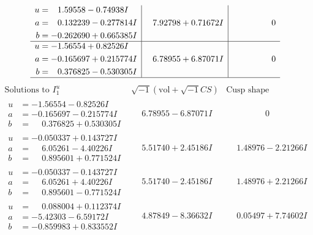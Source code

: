 \documentclass[1p]{elsarticle_modified}
\theoremstyle{definition}
\newcommand{\I}{\sqrt{-1}}
\begin{document}
$$\begin{array}{c|c|c}
\begin{aligned}
u &= \phantom{-}1.59558 - 0.74938 I \\
a &= \phantom{-}0.132239 - 0.277814 I \\
b &= -0.262690 + 0.665385 I\end{aligned}
 & \phantom{-}7.92798 + 0.71672 I & \phantom{-0.000000 } 0 \\ \hline\begin{aligned}
u &= -1.56554 + 0.82526 I \\
a &= -0.165697 + 0.215774 I \\
b &= \phantom{-}0.376825 - 0.530305 I\end{aligned}
 & \phantom{-}6.78955 + 6.87071 I & \phantom{-0.000000 } 0\\
 \hline 
 \end{array}$$\newpage$$\begin{array}{c|c|c}  
\text{Solutions to }I^u_{1}& \I (\text{vol} + \sqrt{-1}CS) & \text{Cusp shape}\\
 \hline 
\begin{aligned}
u &= -1.56554 - 0.82526 I \\
a &= -0.165697 - 0.215774 I \\
b &= \phantom{-}0.376825 + 0.530305 I\end{aligned}
 & \phantom{-}6.78955 - 6.87071 I & \phantom{-0.000000 } 0 \\ \hline\begin{aligned}
u &= -0.050337 + 0.143727 I \\
a &= \phantom{-}6.05261 - 4.40226 I \\
b &= \phantom{-}0.895601 + 0.771524 I\end{aligned}
 & \phantom{-}5.51740 + 2.45186 I & \phantom{-}1.48976 - 2.21266 I \\ \hline\begin{aligned}
u &= -0.050337 - 0.143727 I \\
a &= \phantom{-}6.05261 + 4.40226 I \\
b &= \phantom{-}0.895601 - 0.771524 I\end{aligned}
 & \phantom{-}5.51740 - 2.45186 I & \phantom{-}1.48976 + 2.21266 I \\ \hline\begin{aligned}
u &= \phantom{-}0.088004 + 0.112374 I \\
a &= -5.42303 - 6.59172 I \\
b &= -0.859983 + 0.833552 I\end{aligned}
 & \phantom{-}4.87849 - 8.36632 I & \phantom{-}0.05497 + 7.74602 I \\ \hline\begin{aligned}

\end{aligned}
\end{array}$$
\end{document}

